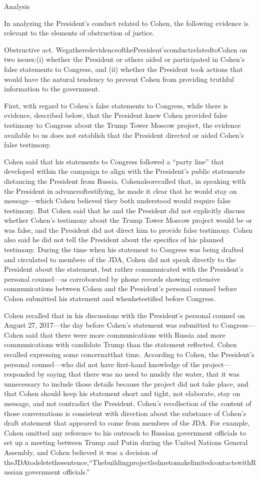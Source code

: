 {Analysis

In analyzing the President's conduct related to Cohen, the following evidence is relevant to the elements of obstruction of justice.

Obstructive act. WegatheredevidenceofthePresident'sconductrelatedtoCohen on two issues:(i) whether the President or others aided or participated in Cohen's false statements to Congress, and (ii) whether the President took actions that would have the natural tendency to prevent Cohen from providing truthful information to the government.

First, with regard to Cohen's false statements to Congress, while there is evidence, described below, that the President knew Cohen provided false testimony to Congress about the Trump Tower Moscow project, the evidence available to us does not establish that the President directed or aided Cohen's false testimony.

Cohen said that his statements to Congress followed a “party line” that developed within the campaign to align with the President's public statements distancing the President from Russia. Cohenalsorecalled that, in speaking with the President in advanceoftestifying, he made it clear that he would stay on message—which Cohen believed they both understood would require false testimony. But Cohen said that he and the President did not explicitly discuss whether Cohen's testimony about the Trump Tower Moscow project would be or was false, and the President did not direct him to provide false testimony. Cohen also said he did not tell the President about the specifics of his planned testimony. During the time when his statement to Congress was being drafted and circulated to members of the JDA, Cohen did not speak directly to the President about the statement, but rather communicated with the President's personal counsel—as corroborated by phone records showing extensive communications between Cohen and the President's personal counsel before Cohen submitted his statement and whenhetestified before Congress.

Cohen recalled that in his discussions with the President's personal counsel on August 27, 2017—the day before Cohen's statement was submitted to Congress—Cohen said that there were more communications with Russia and more communications with candidate Trump than the statement reflected. Cohen recalled expressing some concernatthat time. According to Cohen, the President's personal counsel—who did not have first-hand knowledge of the project— responded by saying that there was no need to muddy the water, that it was unnecessary to include those details because the project did not take place, and that Cohen should keep his statement short and tight, not elaborate, stay on message, and not contradict the President. Cohen's recollection of the content of those conversations is consistent with direction about the substance of Cohen's draft statement that appeared to come from members of the JDA. For example, Cohen omitted any reference to his outreach to Russian government officials to set up a meeting between Trump and Putin during the United Nations General Assembly, and Cohen believed it was a decision of theJDAtodeletethesentence,“ThebuildingprojectledmetomakelimitedcontactswithRussian government officials.”

}
